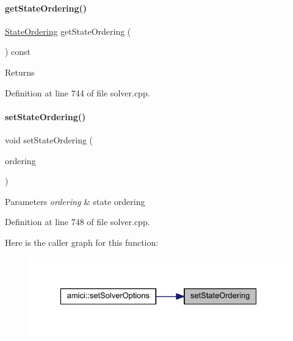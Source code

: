 \paragraph{\texorpdfstring{getStateOrdering()}{getStateOrdering()}}
{\footnotesize\ttfamily \mbox{\hyperlink{namespaceamici_a890d968060d6d830aeed98dbeb04447f}{State\+Ordering}} get\+State\+Ordering (\begin{DoxyParamCaption}{ }\end{DoxyParamCaption}) const}

\begin{DoxyReturn}{Returns}

\end{DoxyReturn}


Definition at line 744 of file solver.\+cpp.

\mbox{\label{classamici_1_1_solver_aa22ae4579c350a6f3fae2e3b5a0da1de}} 
\paragraph{\texorpdfstring{setStateOrdering()}{setStateOrdering()}}
{\footnotesize\ttfamily void set\+State\+Ordering (\begin{DoxyParamCaption}\item[{\mbox{\hyperlink{namespaceamici_a890d968060d6d830aeed98dbeb04447f}{State\+Ordering}}}]{ordering }\end{DoxyParamCaption})}


\begin{DoxyParams}{Parameters}
{\em ordering} & state ordering \\
\hline
\end{DoxyParams}


Definition at line 748 of file solver.\+cpp.

Here is the caller graph for this function\+:
\nopagebreak
\begin{figure}[H]
\begin{center}
\leavevmode
\includegraphics[width=329pt]{classamici_1_1_solver_aa22ae4579c350a6f3fae2e3b5a0da1de_icgraph}
\end{center}
\end{figure}
\mbox{\label{classamici_1_1_solver_ae1e9c3c5e59413ae25fb67c29983e3f3}} 
